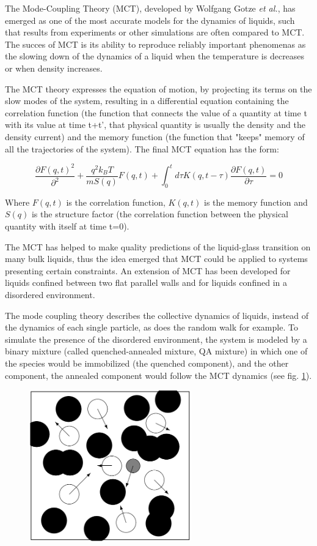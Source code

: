 \documentclass[a4paper,12pt]{article}
\newcommand{\jline}{\vspace{10pt}}
\newcommand{\etal}{\textit{et al.}}
\begin{document}
The Mode-Coupling Theory (MCT), developed by Wolfgang Gotze \etal \cite{Bengtzelius1984}, has emerged as one of the most accurate models for the dynamics of liquids, such that results from experiments or other simulations are often compared to MCT. The succes of MCT is its ability to reproduce reliably important phenomenas as the slowing down of the dynamics of a liquid when the temperature is decreases or when density increases.\jline

The MCT theory expresses the equation of motion, by projecting its terms on the slow modes of the system, resulting in a differential equation containing the correlation function (the function that connects the value of a quantity at time t with its value at time t+t', that physical quantity is usually the density and the density current) and the memory function (the function that "keeps" memory of all the trajectories of the system). The final MCT equation has the form:

\begin{equation}
\frac{\partial F(q,t)^2}{\partial^2}+\frac{q^2k_BT}{mS(q)}F(q,t)+\int_0^t d\tau K(q,t-\tau) \frac{\partial F(q,t)}{\partial \tau}=0
\end{equation}

Where $F(q,t)$ is the correlation function, $K(q,t)$ is the memory function and $S(q)$ is the structure factor (the correlation function between the physical quantity with itself at time t=0).\jline

The MCT has helped to make quality predictions of the liquid-glass transition on many bulk liquids, thus the idea emerged that MCT could be applied to systems presenting certain constraints. An extension of MCT has been developed for liquids confined between two flat parallel walls \cite{Lang2012} and for liquids confined in a disordered environment.\jline

The mode coupling theory describes the collective dynamics of liquids, instead of the dynamics of each single particle, as does the random walk for example. To simulate the presence of the disordered environment, the system is modeled by a binary mixture (called quenched-annealed mixture, QA mixture) in which one of the species would be immobilized (the quenched component), and the other component, the annealed component would follow the MCT dynamics (see fig. \ref{qa mixture}).

\begin{figure}[htbp]
\centering
\subfigure
{\includegraphics[width=7cm]{pics/qa_mixtures.png}}
\caption{}
\label{qa mixture}
\end{figure}

\newpage


\end{document}
